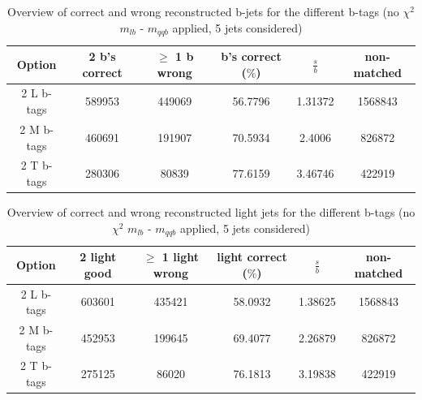 \begin{table}[!h] 
 \begin{tabular}{c|c|c|c|c|c} 
  \textbf{Option} & 2 b's correct & $\geq$ 1 b wrong     & b's correct ($\%$)   & $\frac{s}{b}$ & non-matched \\ \hline 
  2 L b-tags              & 589953 & 449069 & 56.7796 & 1.31372 & 1568843\\ 
  2 M b-tags              & 460691 & 191907 & 70.5934 & 2.4006 & 826872\\ 
  2 T b-tags              & 280306 & 80839 & 77.6159 & 3.46746 & 422919\\ 
 \end{tabular} 
 \caption{Overview of correct and wrong reconstructed b-jets for the different b-tags (no $\chi^{2}$ $m_{lb}$ - $m_{qqb}$ applied, 5 jets considered)}
\end{table} 
 
\begin{table}[!h] 
 \begin{tabular}{c|c|c|c|c|c} 
  \textbf{Option} & 2 light good  & $\geq$ 1 light wrong & light correct ($\%$) & $\frac{s}{b}$ & non-matched \\ \hline 
  2 L b-tags              & 603601 & 435421 & 58.0932 & 1.38625 & 1568843\\ 
  2 M b-tags              & 452953 & 199645 & 69.4077 & 2.26879 & 826872\\ 
  2 T b-tags              & 275125 & 86020 & 76.1813 & 3.19838 & 422919\\ 
 \end{tabular} 
 \caption{Overview of correct and wrong reconstructed light jets for the different b-tags (no $\chi^{2}$ $m_{lb}$ - $m_{qqb}$ applied, 5 jets considered)}
\end{table} 
 

